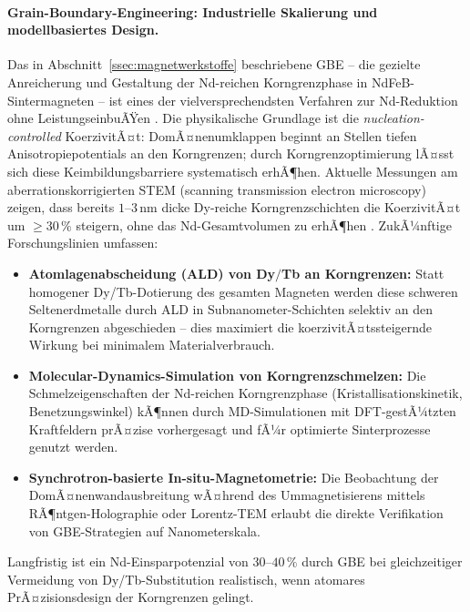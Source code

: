 ﻿\documentclass[12pt, a4paper]{report}
\theoremstyle{definition}
\theoremstyle{remark}
\begin{document}
\paragraph{Grain-Boundary-Engineering: Industrielle Skalierung und
modellbasiertes Design.}
Das in Abschnitt~\ref{ssec:magnetwerkstoffe} beschriebene GBE -- die gezielte
Anreicherung und Gestaltung der Nd-reichen Korngrenzphase in NdFeB-Sintermagneten
-- ist eines der vielversprechendsten Verfahren zur Nd-Reduktion ohne
LeistungseinbuÃŸen \cite{hono2012}. Die physikalische Grundlage ist die
\emph{nucleation-controlled} KoerzivitÃ¤t: DomÃ¤nenumklappen beginnt an Stellen
tiefen Anisotropiepotentials an den Korngrenzen; durch Korngrenzoptimierung lÃ¤sst
sich diese Keimbildungsbarriere systematisch erhÃ¶hen. Aktuelle Messungen am
aberrationskorrigierten STEM (scanning transmission electron microscopy) zeigen,
dass bereits $1$--$3\,\text{nm}$ dicke Dy-reiche Korngrenzschichten die
KoerzivitÃ¤t um $\geq 30\,\%$ steigern, ohne das Nd-Gesamtvolumen zu erhÃ¶hen
\cite{sepehriamin2012}. ZukÃ¼nftige Forschungslinien umfassen:
\begin{itemize}
  \item \textbf{Atomlagenabscheidung (ALD) von Dy$/$Tb an Korngrenzen:} Statt
        homogener Dy/Tb-Dotierung des gesamten Magneten werden diese schweren
        Seltenerdmetalle durch ALD in Subnanometer-Schichten selektiv an den
        Korngrenzen abgeschieden -- dies maximiert die koerzivitÃ¤tssteigernde
        Wirkung bei minimalem Materialverbrauch.
  \item \textbf{Molecular-Dynamics-Simulation von Korngrenzschmelzen:}
        Die Schmelzeigenschaften der Nd-reichen Korngrenzphase (Kristallisations\-kinetik,
        Benetzungswinkel) kÃ¶nnen durch MD-Simulationen mit DFT-gestÃ¼tzten
        Kraftfeldern prÃ¤zise vorhergesagt und fÃ¼r optimierte Sinterprozesse
        genutzt werden.
  \item \textbf{Synchrotron-basierte In-situ-Magnetometrie:} Die Beobachtung
        der DomÃ¤nenwandausbreitung wÃ¤hrend des Ummagnetisierens mittels
        RÃ¶ntgen-Holographie oder Lorentz-TEM erlaubt die direkte Verifikation
        von GBE-Strategien auf Nanometerskala.
\end{itemize}
Langfristig ist ein Nd-Einsparpotenzial von $30$--$40\,\%$ durch GBE bei
gleichzeitiger Vermeidung von Dy/Tb-Substitution realistisch,
wenn atomares PrÃ¤zisionsdesign der Korngrenzen gelingt.
\end{document}
